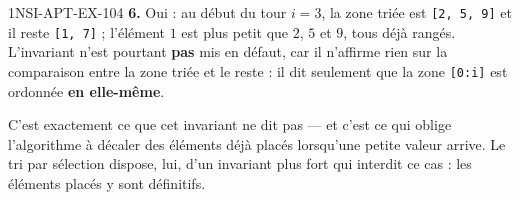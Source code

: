 \begin{corrige}{1NSI-APT-EX-104}
\textbf{6.} Oui : au début du tour $i=3$, la zone triée est \lstinline{[2, 5, 9]} et il
reste \lstinline{[1, 7]} ; l'élément $1$ est plus petit que $2$, $5$ et $9$, tous déjà
rangés. L'invariant n'est pourtant \textbf{pas} mis en défaut, car il n'affirme rien sur
la comparaison entre la zone triée et le reste : il dit seulement que la zone
\lstinline{[0:i]} est ordonnée \textbf{en elle-même}.

C'est exactement ce que cet invariant ne dit pas — et c'est ce qui oblige l'algorithme à
décaler des éléments déjà placés lorsqu'une petite valeur arrive. Le tri par sélection
dispose, lui, d'un invariant plus fort qui interdit ce cas : les éléments placés y sont
définitifs.

\end{corrige}

